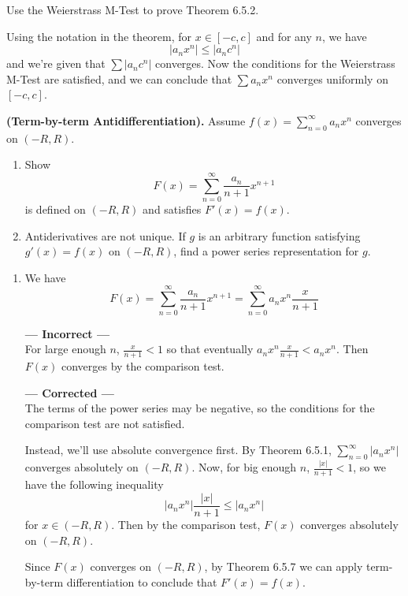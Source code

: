 \documentclass{oxmathproblems}
\begin{document}
\begin{questions}
\miquestion Use the Weierstrass M-Test to prove Theorem 6.5.2.
\begin{solution}
  Using the notation in the theorem, for $x \in [-c, c]$ and for any $n$, we have
  \[|a_{n}x^{n}| \leq |a_{n}c^n| \]
  and we're given that $\sum |a_{n}c^n|$ converges. Now the conditions for the Weierstrass M-Test are satisfied, and we can conclude that
  $\sum a_{n}x^{n}$ converges uniformly on $[-c, c]$.
\end{solution}

\miquestion \textbf{(Term-by-term Antidifferentiation).} Assume $f(x) = \sum_{n=0}^{\infty} a_{n}x^{n}$ converges on $(-R, R)$.
\begin{enumerate}[label=(\alph*)]
  \item Show
  \[F(x) = \sum_{n=0}^{\infty}\frac{a_{n}}{n+1}x^{n+1}\]
  is defined on $(-R, R)$ and satisfies $F'(x)=f(x)$.
  \item Antiderivatives are not unique. If $g$ is an arbitrary function satisfying $g'(x)=f(x)$ on $(-R, R)$, find a power series representation for $g$.
\end{enumerate}

\begin{solution}
  \begin{enumerate}[label=(\alph*)]
    \item We have
    \[F(x) = \sum_{n=0}^{\infty}\frac{a_{n}}{n+1}x^{n+1} = \sum_{n=0}^{\infty} a_{n}x^{n}\frac{x}{n+1}\]
    
    \textbf{--- Incorrect ---}\\
    For large enough $n$, $\frac{x}{n+1} < 1$ so that eventually $a_{n}x^{n}\frac{x}{n+1} < a_{n}x^{n}$. Then $F(x)$ converges by the
    comparison test.

    \textbf{--- Corrected ---}\\
    The terms of the power series may be negative, so the conditions for the comparison test are not satisfied.

    Instead, we'll use absolute convergence first. By Theorem 6.5.1, $\sum_{n=0}^{\infty} |a_{n}x^{n}|$ converges absolutely on $(-R, R)$.
    Now, for big enough $n$, $\frac{|x|}{n+1} < 1$, so we have the following inequality
    \[|a_{n}x^{n}| \frac{|x|}{n+1} \leq |a_{n}x^{n}|\]
    for $x \in (-R, R)$. Then by the comparison test, $F(x)$ converges absolutely on $(-R, R)$.

    Since $F(x)$ converges on $(-R, R)$, by Theorem 6.5.7 we can apply term-by-term differentiation to conclude that $F'(x)=f(x)$.
  

\end{enumerate}
\end{solution}
\end{questions}
\end{document}
